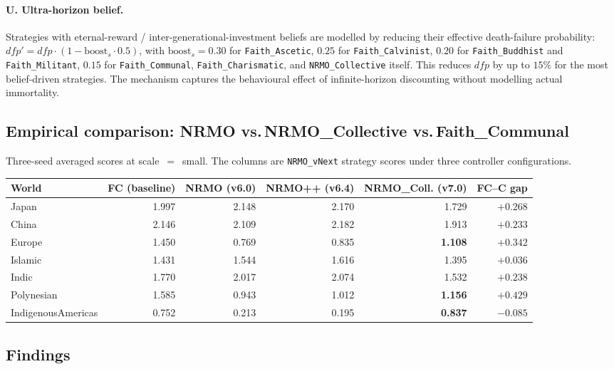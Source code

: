 \paragraph{U. Ultra-horizon belief.}
Strategies with eternal-reward / inter-generational-investment
beliefs are modelled by reducing their effective death-failure
probability:
$\mathit{dfp}' = \mathit{dfp} \cdot (1 - \mathrm{boost}_s \cdot 0.5)$,
with $\mathrm{boost}_s = 0.30$ for \texttt{Faith\_Ascetic}, $0.25$
for \texttt{Faith\_Calvinist}, $0.20$ for \texttt{Faith\_Buddhist}
and \texttt{Faith\_Militant}, $0.15$ for \texttt{Faith\_Communal},
\texttt{Faith\_Charismatic}, and \texttt{NRMO\_Collective} itself.
This reduces $\mathit{dfp}$ by up to $15\%$ for the most belief-driven
strategies. The mechanism captures the behavioural effect of
infinite-horizon discounting without modelling actual immortality.

\subsection{Empirical comparison: NRMO vs.\,NRMO\_Collective vs.\,Faith\_Communal}

Three-seed averaged scores at scale~$=$~small. The columns are
\texttt{NRMO\_vNext} strategy scores under three controller
configurations.

\begin{center}
\small
\begin{tabular}{lrrrrr}
\toprule
World & FC (baseline) & NRMO (v6.0) & NRMO++ (v6.4) & NRMO\_Coll. (v7.0) & FC--C gap \\
\midrule
Japan              & 1.997 & 2.148 & 2.170 & 1.729 & $+0.268$ \\
China              & 2.146 & 2.109 & 2.182 & 1.913 & $+0.233$ \\
Europe             & 1.450 & 0.769 & 0.835 & \textbf{1.108} & $+0.342$ \\
Islamic            & 1.431 & 1.544 & 1.616 & 1.395 & $+0.036$ \\
Indic              & 1.770 & 2.017 & 2.074 & 1.532 & $+0.238$ \\
Polynesian         & 1.585 & 0.943 & 1.012 & \textbf{1.156} & $+0.429$ \\
IndigenousAmericas & 0.752 & 0.213 & 0.195 & \textbf{0.837} & $\mathbf{-0.085}$ \\
\bottomrule
\end{tabular}
\end{center}

\subsection{Findings}

